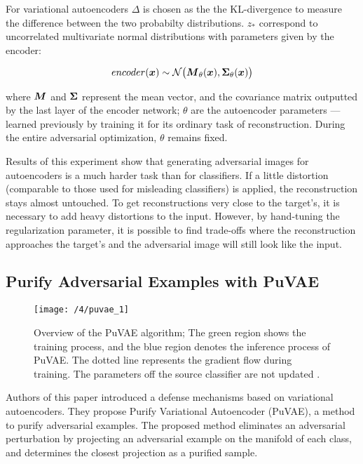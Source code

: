 For variational autoencoders $\Delta$ is chosen as the the KL-divergence to
measure the difference between the two probabilty distributions. $z_{*}$
correspond to uncorrelated multivariate normal distributions with parameters
given by the encoder:

\begin{equation}
    encoder(\boldsymbol{x}) \sim \mathcal{N}\big(\boldsymbol{M}_{\theta}(\boldsymbol{x}), \boldsymbol{\Sigma}_{\theta}(\boldsymbol{x})\big)
\end{equation}

where $\boldsymbol{M}$ and $\boldsymbol{\Sigma}$ represent the mean vector, and the
covariance matrix outputted by the last layer of the encoder network; $\theta$
are the autoencoder parameters \---- learned previously by training it for its
ordinary task of reconstruction. During the entire adversarial optimization,
$\theta$ remains fixed.

Results of this experiment show that generating adversarial images for
autoencoders is a much harder task than for classifiers. If a little distortion
(comparable to those used for misleading classifiers) is applied, the
reconstruction stays almost untouched. To get reconstructions very close to the
target's, it is necessary to add heavy distortions to the input. However, by
hand-tuning the regularization parameter, it is possible to find trade-offs
where the reconstruction approaches the target's and the adversarial image will
still look like the input.

\subsection{Purify Adversarial Examples with PuVAE}
\begin{figure}
	\centering
	\texttt{[image: /4/puvae\_1]}
    \caption{Overview of the PuVAE algorithm; The green region shows the
    training process, and the blue region denotes the inference process of
    PuVAE. The dotted line represents the gradient flow during training. The
    parameters off the source classifier are not updated \cite{hwang2019puvae}.}
    
	\label{fig:puvae_1}
\end{figure}

Authors of this paper \cite{hwang2019puvae} introduced a defense mechanisms
based on variational autoencoders. They propose Purify Variational Autoencoder
(PuVAE), a method to purify adversarial examples. The proposed method eliminates
an adversarial perturbation by projecting an adversarial example on the manifold
of each class, and determines the closest projection as a purified sample.

